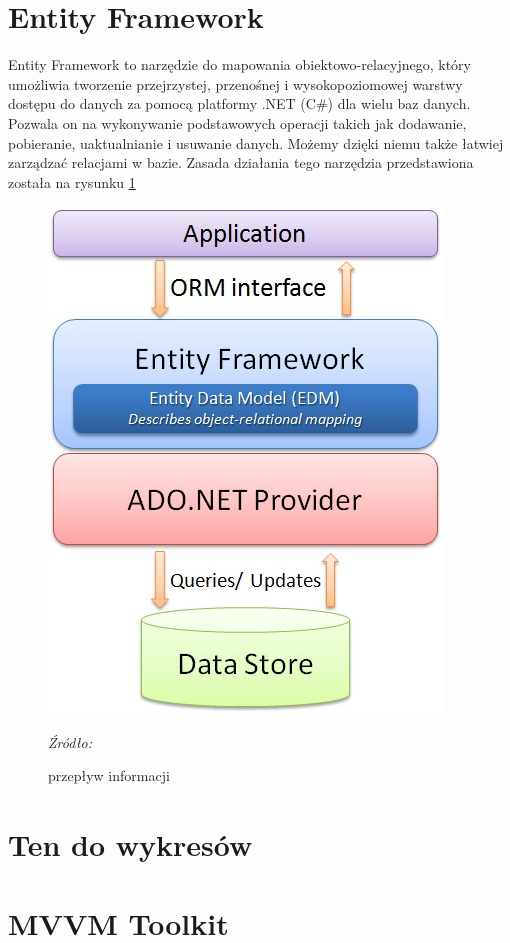 \documentclass[12pt,oneside]{report}
\begin{document}
\section{Entity Framework}
Entity Framework to narzędzie do mapowania obiektowo-relacyjnego, który umożliwia tworzenie przejrzystej, przenośnej i wysokopoziomowej warstwy dostępu do danych za pomocą platformy .NET (C\#) dla wielu baz danych.  Pozwala on na wykonywanie podstawowych operacji takich jak dodawanie, pobieranie, uaktualnianie i usuwanie danych. Możemy dzięki niemu także łatwiej zarządzać relacjami w bazie. Zasada działania tego narzędzia przedstawiona została na rysunku \ref{EntityArchitecture}
\begin{figure}[H]
	\centering
	\includegraphics[scale=0.5]{EntityArchitecture}
	\caption{przepływ informacji}
	\textit{Źródło: \cite{Entity}}
	\label{EntityArchitecture}
\end{figure}
\section{Ten do wykresów}

\section{MVVM Toolkit}
\end{document}
